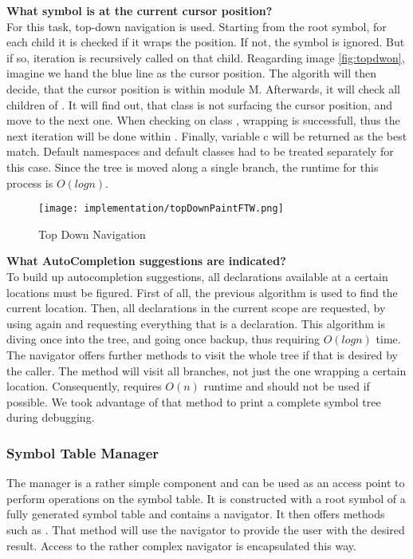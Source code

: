\textbf{What symbol is at the current cursor position?}\\
For this task, top-down navigation is used.
Starting from the root symbol, for each child it is checked if it wraps the position.
If not, the symbol is ignored.
But if so, iteration is recursively called on that child.
Reagarding image \ref{fig:topdwon}, imagine we hand the blue line as the cursor position.
The algorith will then decide, that the cursor position is within module M.
Afterwards, it will check all children of .
It will find out, that class  is not surfacing the cursor position, and move to the next one.
When checking on class , wrapping is successfull, thus the next iteration will be done within .
Finally, variable c will be returned as the best match.
Default namespaces and default classes had to be treated separately for this case.
Since the tree is moved along a single branch, the runtime for this process is $O(logn)$.\\

\begin{figure}[H]
    \centering
    \texttt{[image: implementation/topDownPaintFTW.png]}
    \caption{Top Down Navigation}
    \label{fig:findDecl}
\end{figure}


\textbf{What AutoCompletion suggestions are indicated?}\\
To build up autocompletion suggestions, all declarations available at a certain locations must be figured.
First of all, the previous  algorithm is used to find the current location.
Then, all declarations in the current scope are requested, by using  again and requesting everything that is a declaration.
This algorithm is diving once into the tree, and going once backup, thus requiring $O(logn)$ time.\\

The navigator offers further methods to visit the whole tree if that is desired by the caller.
The method  will visit all branches, not just the one wrapping a certain location.
Consequently,  requires $O(n)$ runtime and should not be used if possible.
We took advantage of that method to print a complete symbol tree during debugging.



\subsubsection{Symbol Table Manager}
The manager is a rather simple component and can be used as an access point to perform operations on the symbol table.
It is constructed with a root symbol of a fully generated symbol table and contains a navigator.
It then offers methods such as .
That method will use the navigator to provide the user with the desired result.
Access to the rather complex navigator is encapsulated this way.

